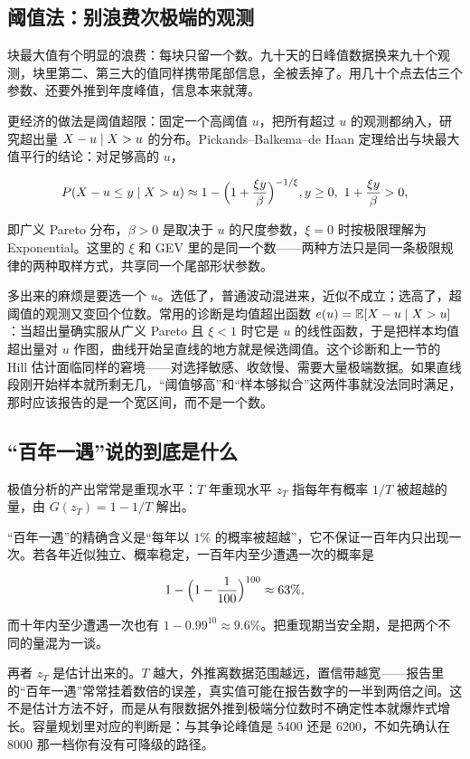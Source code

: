 \subsection{阈值法：别浪费次极端的观测}

块最大值有个明显的浪费：每块只留一个数。九十天的日峰值数据换来九十个观测，块里第二、第三大的值同样携带尾部信息，全被丢掉了。用几十个点去估三个参数、还要外推到年度峰值，信息本来就薄。

更经济的做法是阈值超限：固定一个高阈值 \(u\)，把所有超过 \(u\) 的观测都纳入，研究超出量 \(X-u\mid X>u\) 的分布。Pickands--Balkema--de Haan 定理给出与块最大值平行的结论：对足够高的 \(u\)，

\[
P(X-u\le y\mid X>u)\approx 1-\Bigl(1+\frac{\xi y}{\beta}\Bigr)^{-1/\xi},
\space y\ge0,\ 1+\frac{\xi y}{\beta}>0,
\]

即广义 Pareto 分布，\(\beta>0\) 是取决于 \(u\) 的尺度参数，\(\xi=0\) 时按极限理解为 Exponential。这里的 \(\xi\) 和 GEV 里的是同一个数——两种方法只是同一条极限规律的两种取样方式，共享同一个尾部形状参数。

多出来的麻烦是要选一个 \(u\)。选低了，普通波动混进来，近似不成立；选高了，超阈值的观测又变回个位数。常用的诊断是均值超出函数 \(e(u)=\mathbb{E}[X-u\mid X>u]\)：当超出量确实服从广义 Pareto 且 \(\xi<1\) 时它是 \(u\) 的线性函数，于是把样本均值超出量对 \(u\) 作图，曲线开始呈直线的地方就是候选阈值。这个诊断和上一节的 Hill 估计面临同样的窘境——对选择敏感、收敛慢、需要大量极端数据。如果直线段刚开始样本就所剩无几，``阈值够高''和``样本够拟合''这两件事就没法同时满足，那时应该报告的是一个宽区间，而不是一个数。

\subsection{``百年一遇''说的到底是什么}

极值分析的产出常常是重现水平：\(T\) 年重现水平 \(z_T\) 指每年有概率 \(1/T\) 被超越的量，由 \(G(z_T)=1-1/T\) 解出。

``百年一遇''的精确含义是``每年以 \(1\%\) 的概率被超越''，它不保证一百年内只出现一次。若各年近似独立、概率稳定，一百年内至少遭遇一次的概率是

\[
1-\Bigl(1-\frac{1}{100}\Bigr)^{100}\approx 63\%,
\]

而十年内至少遭遇一次也有 \(1-0.99^{10}\approx9.6\%\)。把重现期当安全期，是把两个不同的量混为一谈。

再者 \(z_T\) 是估计出来的。\(T\) 越大，外推离数据范围越远，置信带越宽——报告里的``百年一遇''常常挂着数倍的误差，真实值可能在报告数字的一半到两倍之间。这不是估计方法不好，而是从有限数据外推到极端分位数时不确定性本就爆炸式增长。容量规划里对应的判断是：与其争论峰值是 \(5400\) 还是 \(6200\)，不如先确认在 \(8000\) 那一档你有没有可降级的路径。

